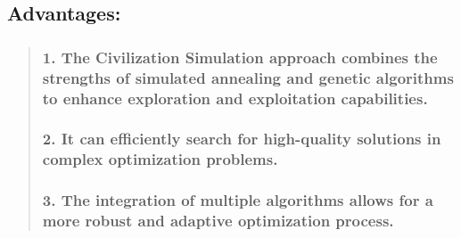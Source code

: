 \documentclass[11pt]{article}
\begin{document}
\begin{itemize}
  \hypertarget{advantages}{%
  \subsection{\texorpdfstring{
  Advantages:}{  Advantages:}}\label{advantages}}

  \begin{quote}
  \hypertarget{the-civilization-simulation-approach-combines-the-strengths-of-simulated-annealing-and-genetic-algorithms-to-enhance-exploration-and-exploitation-capabilities.}{%
  \subsubsection{\texorpdfstring{ 1. The Civilization Simulation
  approach combines the strengths of simulated annealing and genetic
  algorithms to enhance exploration and exploitation
  capabilities.}{  1. The Civilization Simulation approach combines the strengths of simulated annealing and genetic algorithms to enhance exploration and exploitation capabilities.}}\label{the-civilization-simulation-approach-combines-the-strengths-of-simulated-annealing-and-genetic-algorithms-to-enhance-exploration-and-exploitation-capabilities.}}

  \hypertarget{it-can-efficiently-search-for-high-quality-solutions-in-complex-optimization-problems.}{%
  \subsubsection{\texorpdfstring{ 2. It can efficiently search for
  high-quality solutions in complex optimization
  problems.}{  2. It can efficiently search for high-quality solutions in complex optimization problems.}}\label{it-can-efficiently-search-for-high-quality-solutions-in-complex-optimization-problems.}}

  \hypertarget{the-integration-of-multiple-algorithms-allows-for-a-more-robust-and-adaptive-optimization-process.}{%
  \subsubsection{\texorpdfstring{ 3. The integration of multiple
  algorithms allows for a more robust and adaptive optimization
  process.}{  3. The integration of multiple algorithms allows for a more robust and adaptive optimization process.}}\label{the-integration-of-multiple-algorithms-allows-for-a-more-robust-and-adaptive-optimization-process.}}
  \end{quote}
\end{itemize}
\end{document}
